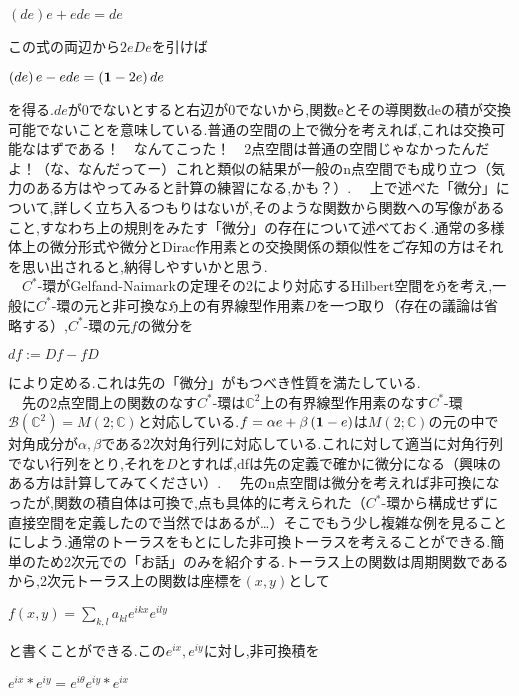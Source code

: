 \begin{center}
$\left(de\right)e+ede=de$
\end{center}
この式の両辺から$2eDe$を引けば
\begin{center}
$\left(de\right)e-ede=\left({\bf 1}-2e\right)de$
\end{center}
を得る.$de$が0でないとすると右辺が$0$でないから,関数eとその導関数deの積が交換可能でないことを意味している.普通の空間の上で微分を考えれば,これは交換可能なはずである！　なんてこった！　2点空間は普通の空間じゃなかったんだよ！（な、なんだってー）これと類似の結果が一般のn点空間でも成り立つ（気力のある方はやってみると計算の練習になる,かも？）.
　上で述べた「微分」について,詳しく立ち入るつもりはないが,そのような関数から関数への写像があること,すなわち上の規則をみたす「微分」の存在について述べておく.通常の多様体上の微分形式や微分とDirac作用素との交換関係の類似性をご存知の方はそれを思い出されると,納得しやすいかと思う.\\
　$C^*$-環がGelfand-Naimarkの定理その2により対応するHilbert空間を$\mathfrak{H}$を考え,一般に$C^*$-環の元と非可換な$\mathfrak{H}$上の有界線型作用素$D$を一つ取り（存在の議論は省略する）,$C^*$-環の元$f$の微分を
\begin{center}
$df:=Df-fD$
\end{center}
により定める.これは先の「微分」がもつべき性質を満たしている.\\
　先の2点空間上の関数のなす$C^*$-環は$\mathbb{C}^2$上の有界線型作用素のなす$C^*$-環$\mathcal{B}\left(\mathbb{C}^2\right)=M\left(2;\mathbb{C}\right)$と対応している.$f=\alpha e+\beta \left({\bf 1}-e\right)$は$M\left(2;\mathbb{C}\right)$の元の中で対角成分が$\alpha,\beta$である2次対角行列に対応している.これに対して適当に対角行列でない行列をとり,それを$D$とすれば,dfは先の定義で確かに微分になる（興味のある方は計算してみてください）.
　先のn点空間は微分を考えれば非可換になったが,関数の積自体は可換で,点も具体的に考えられた（$C^*$-環から構成せずに直接空間を定義したので当然ではあるが…）そこでもう少し複雑な例を見ることにしよう.通常のトーラスをもとにした非可換トーラスを考えることができる.簡単のため2次元での「お話」のみを紹介する.トーラス上の関数は周期関数であるから,2次元トーラス上の関数は座標を$\left(x,y\right)$として
\begin{center}
$f\left(x,y\right)=\sum_{k,l} a_{kl}e^{ikx}e^{ily}$
\end{center}
と書くことができる.この$e^{ix},e^{iy}$に対し,非可換積を
\begin{center}
$e^{ix}*e^{iy}=e^{i\theta}e^{iy}*e^{ix}$
\end{center}
